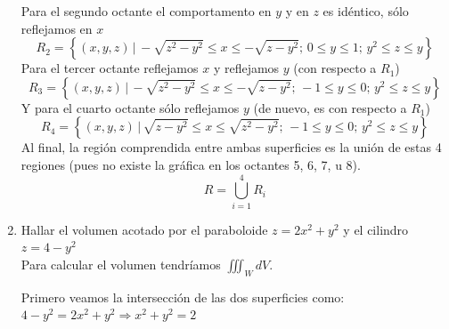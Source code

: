 \documentclass{article}
\begin{document}
\begin{enumerate}
{        Para el segundo octante el comportamento en $y$ y en $z$ es idéntico, sólo reflejamos en $x$
        \[
            R_2=\left\{
                    (x,y,z)\,\big\vert\,
                    -\sqrt{z^2-y^2}\leq x\leq-\sqrt{z-y^2};\,
                    0\leq y\leq 1;\,
                    y^2\leq z\leq y
                \right\}
        \]
        Para el tercer octante reflejamos $x$ y reflejamos $y$ (con respecto a $R_1$)
        \[
            R_3=\left\{
                    (x,y,z)\,\big\vert\,
                    -\sqrt{z^2-y^2}\leq x\leq-\sqrt{z-y^2};\,
                    -1\leq y\leq 0;\,
                    y^2\leq z\leq y
                \right\}
        \]
        Y para el cuarto octante sólo reflejamos $y$ (de nuevo, es con respecto a $R_1$)
        \[
            R_4=\left\{
                    (x,y,z)\,\big\vert\,
                    \sqrt{z-y^2}\leq x\leq\sqrt{z^2-y^2};\,
                    -1\leq y\leq 0;\,
                    y^2\leq z\leq y
                \right\}
        \]
        Al final, la región comprendida entre ambas superficies es la unión de estas 4 regiones (pues no existe la gráfica en los octantes 5, 6, 7, u 8).
        \[
            R=\bigcup_{i=1}^4{R_i}
        \]
    }

    \item {
        Hallar el volumen acotado por el paraboloide $z = 2x^2 + y^2$ y el cilindro $z = 4 - y^2$\\

        \color{azul}
        Para calcular el volumen tendríamos $\iiint_W dV$.

        Primero veamos la intersección de las dos superficies como: $4-y^2 = 2x^2 + y^2 \Rightarrow x^2+y^2 = 2$

}
\end{enumerate}
\end{document}
